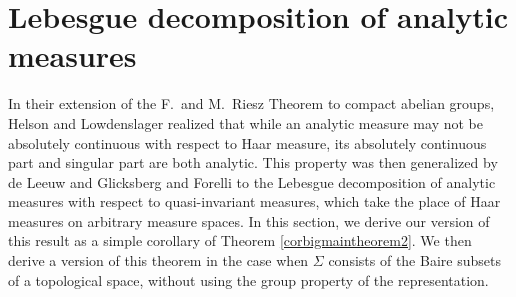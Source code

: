 \section{Lebesgue decomposition of analytic measures}
\newtheorem{defqi}{Definition}[section]
\newtheorem{decomposition}[defqi]{Theorem}
\newtheorem{8nov94remark2}[defqi]{Remark}
\newtheorem{notstronganalytic}[defqi]{Example}
\newtheorem{fandmriesz2}[defqi]{Theorem}
In their extension of the F.\ and M.\ Riesz Theorem
to compact abelian groups, Helson
and Lowdenslager \cite{hl1} realized that while an analytic
measure may not be absolutely continuous with respect to
Haar measure, its absolutely continuous part and singular part
are both analytic.  This property was then generalized by
de Leeuw and Glicksberg \cite{dg} and Forelli \cite{forelli} 
to the Lebesgue decomposition of analytic measures with respect
to quasi-invariant measures, which take the place of
Haar measures on arbitrary measure spaces.  
In this section, we derive our version of this result as a simple
corollary of Theorem \ref{corbigmaintheorem2}.  We then 
derive a version of this theorem in the case when $\Sigma$ consists
of the Baire subsets of a topological space,
without using the group property of the 
representation.

